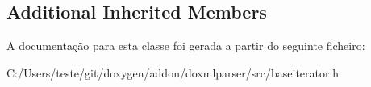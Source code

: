 \subsection*{Additional Inherited Members}


A documentação para esta classe foi gerada a partir do seguinte ficheiro\-:\begin{DoxyCompactItemize}
\item 
C\-:/\-Users/teste/git/doxygen/addon/doxmlparser/src/baseiterator.\-h\end{DoxyCompactItemize}
